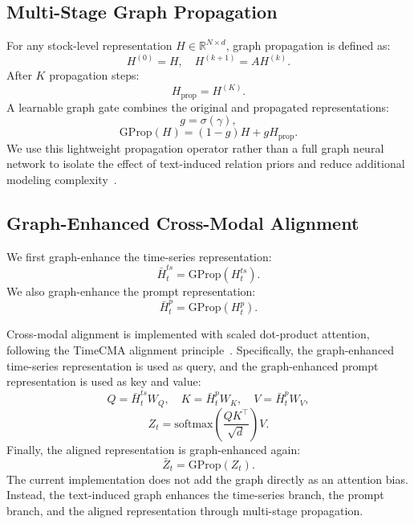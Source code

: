 \documentclass[runningheads]{llncs}
\begin{document}
\subsection{Multi-Stage Graph Propagation}

For any stock-level representation $H \in \mathbb{R}^{N \times d}$, graph propagation is defined as:
\begin{equation}
H^{(0)} = H, \quad H^{(k+1)} = A H^{(k)}.
\end{equation}
After $K$ propagation steps:
\begin{equation}
H_{\text{prop}} = H^{(K)}.
\end{equation}
A learnable graph gate combines the original and propagated representations:
\begin{equation}
g = \sigma(\gamma),
\end{equation}
\begin{equation}
\text{GProp}(H) = (1-g)H + gH_{\text{prop}}.
\end{equation}
We use this lightweight propagation operator rather than a full graph neural network to isolate the effect of text-induced relation priors and reduce additional modeling complexity~\cite{kipf2017semi,velivckovic2018graph}.

\subsection{Graph-Enhanced Cross-Modal Alignment}

We first graph-enhance the time-series representation:
\begin{equation}
\bar{H}^{ts}_t = \text{GProp}(H^{ts}_t).
\end{equation}
We also graph-enhance the prompt representation:
\begin{equation}
\bar{H}^{p}_t = \text{GProp}(H^{p}_t).
\end{equation}

Cross-modal alignment is implemented with scaled dot-product attention, following the TimeCMA alignment principle~\cite{liu2025timecma}. Specifically, the graph-enhanced time-series representation is used as query, and the graph-enhanced prompt representation is used as key and value:
\begin{equation}
Q = \bar{H}^{ts}_t W_Q, \quad
K = \bar{H}^{p}_t W_K, \quad
V = \bar{H}^{p}_t W_V,
\end{equation}
\begin{equation}
Z_t = \text{softmax}\left(\frac{QK^\top}{\sqrt{d}}\right)V.
\end{equation}
Finally, the aligned representation is graph-enhanced again:
\begin{equation}
\bar{Z}_t = \text{GProp}(Z_t).
\end{equation}
The current implementation does not add the graph directly as an attention bias. Instead, the text-induced graph enhances the time-series branch, the prompt branch, and the aligned representation through multi-stage propagation.
\end{document}
